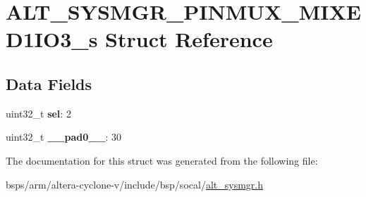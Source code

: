 \hypertarget{structALT__SYSMGR__PINMUX__MIXED1IO3__s}{}\section{A\+L\+T\+\_\+\+S\+Y\+S\+M\+G\+R\+\_\+\+P\+I\+N\+M\+U\+X\+\_\+\+M\+I\+X\+E\+D1\+I\+O3\+\_\+s Struct Reference}
\label{structALT__SYSMGR__PINMUX__MIXED1IO3__s}
\subsection*{Data Fields}
\begin{DoxyCompactItemize}
\item 
\mbox{\label{structALT__SYSMGR__PINMUX__MIXED1IO3__s_a925e5f8209bf9ce54a914ae127ec327c}} 
uint32\+\_\+t {\bfseries sel}\+: 2
\item 
\mbox{\label{structALT__SYSMGR__PINMUX__MIXED1IO3__s_ac753bd87210155d0ffd5213b1c4dda40}} 
uint32\+\_\+t {\bfseries \+\_\+\+\_\+pad0\+\_\+\+\_\+}\+: 30
\end{DoxyCompactItemize}


The documentation for this struct was generated from the following file\+:\begin{DoxyCompactItemize}
\item 
bsps/arm/altera-\/cyclone-\/v/include/bsp/socal/\mbox{\hyperlink{alt__sysmgr_8h}{alt\+\_\+sysmgr.\+h}}\end{DoxyCompactItemize}
